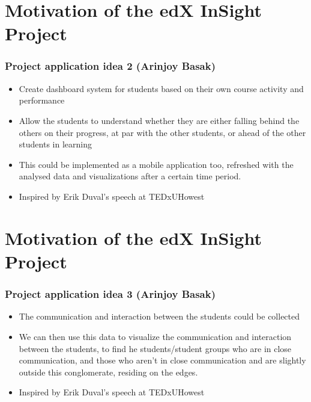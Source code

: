\documentclass[12pt,xcolor=dvipsnames]{beamer}
\begin{document}
\section{Motivation of the edX InSight Project}
\begin{frame}[t]
\frametitle{Project application idea 2 (Arinjoy Basak)}

\begin{itemize}
\item Create dashboard system for students based on their own course activity and performance
\item Allow the students to understand whether they are either falling behind the others on their progress, at par with the other students, or ahead of the other students in learning
\item This could be implemented as a mobile application too, refreshed with the analysed data and visualizations after a certain time period.
\item Inspired by Erik Duval's speech at TEDxUHowest
\end{itemize}
\end{frame}

\section{Motivation of the edX InSight Project}
\begin{frame}[t]
\frametitle{Project application idea 3 (Arinjoy Basak)}

\begin{itemize}
\item The communication and interaction between the students could be collected
\hfill
\item We can then use this data to visualize the communication and interaction between the students, to find he students/student groups who are in close communication, and those who aren't in close communication and are slightly outside this conglomerate, residing on the edges.
\item Inspired by Erik Duval's speech at TEDxUHowest
\end{itemize}
\end{frame}
\end{document}
